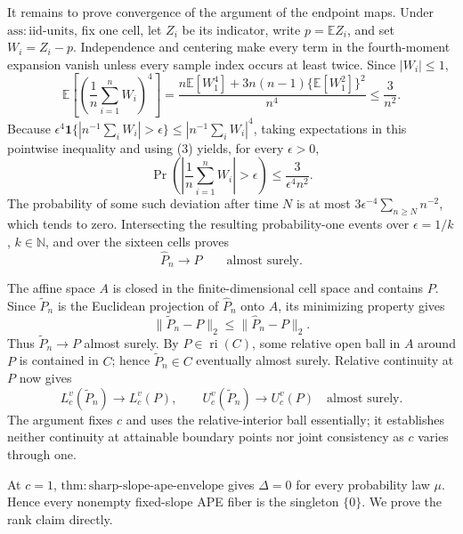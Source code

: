 It remains to prove convergence of the argument of the endpoint maps.  Under \(\mathrm{ass{:}iid\text{-}units}\), fix one cell, let \(Z_i\) be its indicator, write \(p=\mathbb E Z_i\), and set \(W_i=Z_i-p\).  Independence and centering make every term in the fourth-moment expansion vanish unless every sample index occurs at least twice.  Since \(|W_i|\le1\),
\[
 \mathbb E\!\left[\left(\frac1n\sum_{i=1}^nW_i\right)^4\right]
 =\frac{n\mathbb E[W_1^4]+3n(n-1)\{\mathbb E[W_1^2]\}^2}{n^4}
 \le\frac3{n^2}. \tag{3}
\]
Because \(\epsilon^4\mathbf 1\{|n^{-1}\sum_iW_i|>\epsilon\}\le|n^{-1}\sum_iW_i|^4\), taking expectations in this pointwise inequality and using (3) yields, for every \(\epsilon>0\),
\[
 \Pr\!\left(\left|\frac1n\sum_{i=1}^nW_i\right|>\epsilon\right)
 \le\frac3{\epsilon^4n^2}. \tag{4}
\]
The probability of some such deviation after time \(N\) is at most \(3\epsilon^{-4}\sum_{n\ge N}n^{-2}\), which tends to zero.  Intersecting the resulting probability-one events over \(\epsilon=1/k\), \(k\in\mathbb N\), and over the sixteen cells proves
\[
 \widehat P_n\longrightarrow P\qquad\text{almost surely}. \tag{5}
\]

The affine space \(A\) is closed in the finite-dimensional cell space and contains \(P\).  Since \(\widetilde P_n\) is the Euclidean projection of \(\widehat P_n\) onto \(A\), its minimizing property gives
\[
 \|\widetilde P_n-P\|_2\le\|\widehat P_n-P\|_2. \tag{6}
\]
Thus \(\widetilde P_n\to P\) almost surely.  By \(P\in\operatorname{ri}(C)\), some relative open ball in \(A\) around \(P\) is contained in \(C\); hence \(\widetilde P_n\in C\) eventually almost surely.  Relative continuity at \(P\) now gives
\[
 L_c^v(\widetilde P_n)\longrightarrow L_c^v(P),
 \qquad
 U_c^v(\widetilde P_n)\longrightarrow U_c^v(P)
 \quad\text{almost surely}. \tag{7}
\]
The argument fixes \(c\) and uses the relative-interior ball essentially; it establishes neither continuity at attainable boundary points nor joint consistency as \(c\) varies through one.

At \(c=1\), \(\mathrm{thm{:}sharp\text{-}slope\text{-}ape\text{-}envelope}\) gives \(\Delta=0\) for every probability law \(\mu\).  Hence every nonempty fixed-slope APE fiber is the singleton \(\{0\}\).  We prove the rank claim directly.

